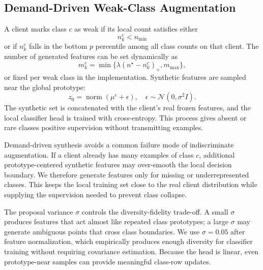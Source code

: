 ﻿\documentclass[conference]{IEEEtran}
\begin{document}
\subsection{Demand-Driven Weak-Class Augmentation}
A client marks class $c$ as weak if its local count satisfies either
\begin{equation}
n_k^c < n_{\min}
\end{equation}
or if $n_k^c$ falls in the bottom $p$ percentile among all class counts on that client. The number of generated features can be set dynamically as
\begin{equation}
m_k^c = \min\{\lambda(n^\star-n_k^c)_+, m_{\max}\},
\end{equation}
or fixed per weak class in the implementation. Synthetic features are sampled near the global prototype:
\begin{equation}
z_0 = \operatorname{norm}(\mu^c + \epsilon), \quad \epsilon\sim\mathcal{N}(0,\sigma^2 I).
\end{equation}
The synthetic set is concatenated with the client's real frozen features, and the local classifier head is trained with cross-entropy. This process gives absent or rare classes positive supervision without transmitting examples.

Demand-driven synthesis avoids a common failure mode of indiscriminate augmentation. If a client already has many examples of class $c$, additional prototype-centered synthetic features may over-smooth the local decision boundary. We therefore generate features only for missing or underrepresented classes. This keeps the local training set close to the real client distribution while supplying the supervision needed to prevent class collapse.

The proposal variance $\sigma$ controls the diversity-fidelity trade-off. A small $\sigma$ produces features that act almost like repeated class prototypes; a large $\sigma$ may generate ambiguous points that cross class boundaries. We use $\sigma = 0.05$ after feature normalization, which empirically produces enough diversity for classifier training without requiring covariance estimation. Because the head is linear, even prototype-near samples can provide meaningful class-row updates.
\end{document}
